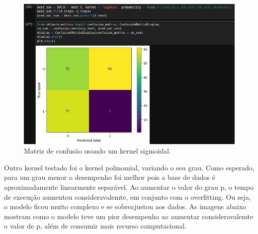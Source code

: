 \documentclass{article} %
\begin{document}
   \begin{figure}[h] %
       \centering %
       \includegraphics[width=0.75\linewidth]{sigmoidal_kernel.png} %
       \caption{Matriz de confusão usando um kernel sigmoidal.} %
       \label{fig:exemplo} %
   \end{figure}
   
   \vspace{1cm}
   
   Outro kernel testado foi o kernel polinomial, variando o seu grau. Como esperado, para um grau menor o desempenho foi melhor pois a base de dados é aproximadamente linearmente separável. Ao aumentar o valor do grau p, o tempo de execução aumentou consideravalemte, em conjunto com o overfitting. Ou seja, o modelo ficou muito complexo e se sobreajustou aos dados. As imagens abaixo mostram como o modelo teve um pior desempenho ao aumentar consideravalemte o valor de p, além de consumir mais recurso computacional.
   
\end{document}
